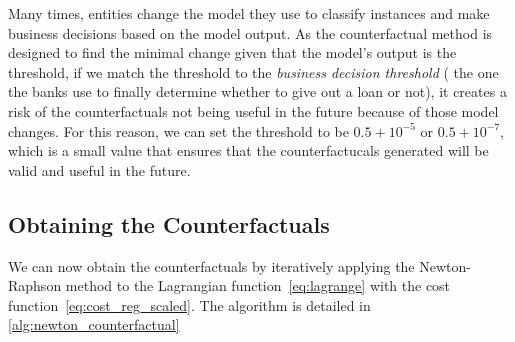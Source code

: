 \documentclass[12pt]{extarticle}
\numberwithin{equation}{section}
\begin{document}
Many times, entities change the model they use to classify instances and make business decisions based on the model output. As the counterfactual method is designed to find the minimal change given that the model's output is the threshold, if we match the threshold to the \emph{business decision threshold} ( the one the banks use to finally determine whether to give out a loan or not), it creates a risk of the counterfactuals not being useful in the future because of those model changes. For this reason, we can set the threshold to be $0.5 + 10^{-5}$ or $0.5 + 10^{-7}$, which is a small value that ensures that the counterfactucals generated will be valid and useful in the future.

\subsection{Obtaining the Counterfactuals}
We can now obtain the counterfactuals by iteratively applying the Newton-Raphson method to the Lagrangian function~\eqref{eq:lagrange} with the cost function~\eqref{eq:cost_reg_scaled}. The algorithm is detailed in \autoref{alg:newton_counterfactual}
\end{document}
